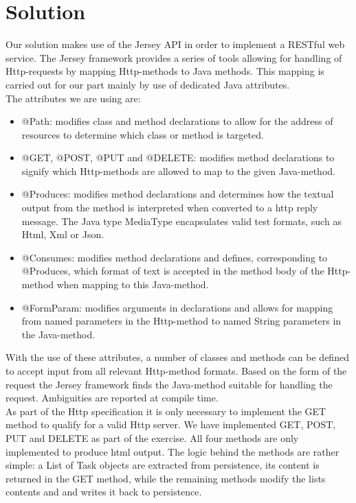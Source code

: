 \section{Solution}
\label{rest_solution}
Our solution makes use of the Jersey API in order to implement a RESTful web service. The Jersey framework provides a series of tools allowing for handling of Http-requests by mapping Http-methods to Java methods. This mapping is carried out for our part mainly by use of dedicated Java attributes.\\
The attributes we are using are:\\
\begin{itemize}
	\item @Path: modifies class and method declarations to allow for the address of resources to determine which class or method is targeted.
	\item @GET, @POST, @PUT and @DELETE: modifies method declarations to signify which Http-methods are allowed to map to the given Java-method.
	\item @Produces: modifies method declarations and determines how the textual output from the method is interpreted when converted to a http reply message. The Java type MediaType encapsulates valid test formats, such as Html, Xml or Json.
	\item @Consumes: modifies method declarations and defines, corresponding to @Produces, which format of text is accepted in the method body of the Http-method when mapping to this Java-method. 
	\item @FormParam: modifies arguments in declarations and allows for mapping from named parameters in the Http-method to named String parameters in the Java-method.
\end{itemize}
With the use of these attributes, a number of classes and methods can be defined to accept input from all relevant Http-method formats. Based on the form of the request the Jersey framework finds the Java-method suitable for handling the request. Ambiguities are reported at compile time.\\
As part of the Http specification it is only necessary to implement the GET method to qualify for a valid Http server. We have implemented GET, POST, PUT and DELETE as part of the exercise. All four methods are only implemented to produce html output. The logic behind the methods are rather simple: a List of Task objects are extracted from persistence, its content is returned in the GET method, while the remaining methods modify the lists contents and and writes it back to persistence.\\


